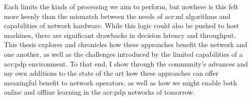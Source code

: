 Each limits the kinds of processing we aim to perform, but nowhere is this felt more keenly than the mismatch between the needs of \gls{acr:ml} algorithms and capabilities of network hardware.
While this logic could also be pushed to host machines, there are significant drawbacks in decision latency and throughput.
This thesis explores and chronicles how these approaches benefit the network and one another, as well as the challenges introduced by the limited capabilities of a \gls{acr:pdp} environment.
To that end, I show through the community's advances and my own additions to the state of the art how these approaches can offer meaningful benefit to network operators, as well as how we might enable both online and offline learning in the \gls{acr:pdp} networks of tomorrow.






%

